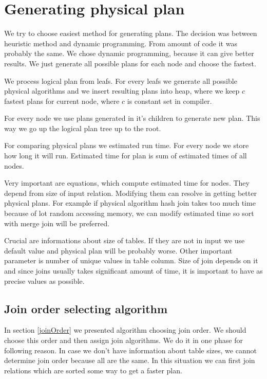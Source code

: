 \section{Generating physical plan}

We try to choose easiest method for generating plans. The decision was between heuristic method and dynamic programming. From amount of code it was probably the same. We chose dynamic programming, because it can give better results. We just generate all possible plans for each node and choose the fastest.

We process logical plan from leafs. For every leafs we generate all possible physical algorithms and we insert resulting plans into heap, where we keep $c$ fastest plans for current node, where $c$ is constant set in compiler.

For every node we use plans generated in it's children to generate new plan. This way we go up the logical plan tree up to the root.

For comparing physical plans we estimated run time. For every node we store how long it will run. Estimated time for plan is sum of estimated times of all nodes.

Very important are equations, which compute estimated time for nodes. They depend from size of input relation. Modifying them can resolve in getting better physical plans. For example if physical algorithm hash join takes too much time because of lot random accessing memory, we can modify estimated time so sort with merge join will be preferred.

Crucial are informations about size of tables. If they are not in input we use default value and physical plan will be probably worse. Other important parameter is number of unique values in table column. Size of join depends on it and since joins usually takes significant amount of time, it is important to have as precise values as possible. 

\subsection{Join order selecting algorithm}


In section \ref{joinOrder} we presented algorithm choosing join order. We should choose this order and then assign join algorithms. We do it in one phase for following reason. In case we don't have information about table sizes, we cannot determine join order because all are the same. In this situation we can first join relations which are sorted some way to get a faster plan.

